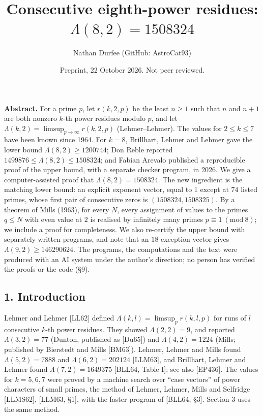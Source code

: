 \documentclass[
]{amsart}
\title{Consecutive eighth-power residues: \(\Lambda(8,2)=1508324\)}
\author{Nathan Durfee (GitHub: AstroCat93)}
\date{Preprint, 22 October 2026. Not peer reviewed.}
\begin{document}
\maketitle

\textbf{Abstract.} For a prime \(p\), let \(r(k,2,p)\) be the least
\(n\ge1\) such that \(n\) and \(n+1\) are both nonzero \(k\)-th power
residues modulo \(p\), and let
\(\Lambda(k,2)=\limsup_{p\to\infty}r(k,2,p)\) (Lehmer--Lehmer). The
values for \(2\le k\le7\) have been known since 1964. For \(k=8\),
Brillhart, Lehmer and Lehmer gave the lower bound
\(\Lambda(8,2)\ge1200744\); Don Reble reported
\(1499876\le\Lambda(8,2)\le1508324\); and Fabian Arevalo published a
reproducible proof of the upper bound, with a separate checker program,
in 2026. We give a computer-assisted proof that
\(\Lambda(8,2)=1508324\). The new ingredient is the matching lower
bound: an explicit exponent vector, equal to \(1\) except at \(74\)
listed primes, whose first pair of consecutive zeros is
\((1508324,1508325)\). By a theorem of Mills (1963), for every \(N\),
every assignment of values to the primes \(q\le N\) with even value at
\(2\) is realised by infinitely many primes
\(p\equiv1\ (\mathrm{mod}\ 8)\); we include a proof for completeness. We
also re-certify the upper bound with separately written programs, and
note that an \(18\)-exception vector gives \(\Lambda(9,2)\ge146290624\).
The programs, the computations and the text were produced with an AI
system under the author's direction; no person has verified the proofs
or the code (§9).

\hypertarget{introduction}{%
\subsection{1. Introduction}\label{introduction}}

Lehmer and Lehmer {[}LL62{]} defined \(\Lambda(k,l)=\limsup_p r(k,l,p)\)
for runs of \(l\) consecutive \(k\)-th power residues. They showed
\(\Lambda(2,2)=9\), and reported \(\Lambda(3,2)=77\) (Dunton, published
as {[}Du65{]}) and \(\Lambda(4,2)=1224\) (Mills; published by Bierstedt
and Mills {[}BM63{]}). Lehmer, Lehmer and Mills found
\(\Lambda(5,2)=7888\) and \(\Lambda(6,2)=202124\) {[}LLM63{]}, and
Brillhart, Lehmer and Lehmer found \(\Lambda(7,2)=1649375\) {[}BLL64,
Table I{]}; see also {[}EP436{]}. The values for \(k=5,6,7\) were proved
by a machine search over ``case vectors'' of power characters of small
primes, the method of Lehmer, Lehmer, Mills and Selfridge {[}LLMS62{]},
{[}LLM63, §1{]}, with the faster program of {[}BLL64, §3{]}. Section 3
uses the same method.
\end{document}
